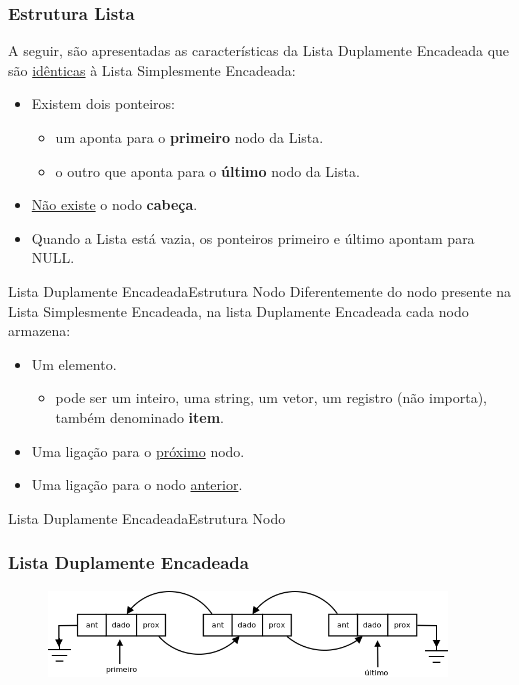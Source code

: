 \documentclass[aspectratio=169]{beamer}
\begin{document}
\begin{frame}
\frametitle{Estrutura Lista}
A seguir, são apresentadas as características da Lista Duplamente Encadeada que são \underline{idênticas} à Lista Simplesmente Encadeada:
\begin{itemize}
 \item Existem dois ponteiros:
 \begin{itemize}
    \item um aponta para o {\bf primeiro} nodo da Lista.
    \item o outro que aponta para o {\bf último} nodo da Lista.
 \end{itemize}
 \item \underline{Não existe} o nodo {\bf cabeça}.
 \item Quando a Lista está vazia, os ponteiros primeiro e último apontam para NULL.
\end{itemize}
\end{frame}


\begin{frame}{Lista Duplamente Encadeada}{Estrutura Nodo}
Diferentemente do nodo presente na Lista Simplesmente Encadeada, na lista Duplamente Encadeada cada nodo armazena:
\begin{itemize}
 \item Um elemento.
  \begin{itemize}
  \item pode ser um inteiro, uma string, um vetor, um registro (não importa), também denominado {\bf item}.
  \end{itemize}  
 \item Uma ligação para o \underline{próximo} nodo.
 \item Uma ligação para o nodo \underline{anterior}.
 \end{itemize}
\end{frame}


\begin{frame}[fragile]{Lista Duplamente Encadeada}{Estrutura Nodo}
\begin{algorithm}[H]
\caption{Nodo} 
\label{Nodo}
\end{algorithm} 
\end{frame}


\begin{frame}
\frametitle{Lista Duplamente Encadeada}
\begin{figure}[!h]
  \centering
  \includegraphics[width=300pt]{imgs/lista_duplamente_encadeada.png}
  \label{fig_lista_duplamente_encadeada}
\end{figure}
\end{frame}
\end{document}
